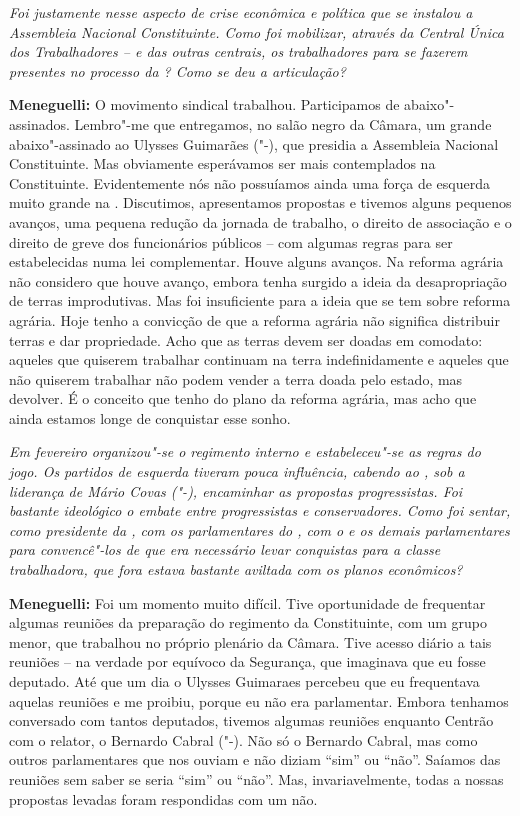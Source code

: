 \emph{Foi justamente nesse aspecto de crise econômica e política que
se instalou a Assembleia Nacional Constituinte. Como foi mobilizar,
através da Central Única dos Trabalhadores --  e das outras centrais,
os trabalhadores para se fazerem presentes no processo da ? Como se
deu a articulação?}

\textbf{Meneguelli:} O movimento sindical trabalhou. Participamos de
abaixo"-assinados. Lembro"-me que entregamos, no salão negro da Câmara, um
grande abaixo"-assinado ao Ulysses Guimarães ("-), que presidia a
Assembleia Nacional Constituinte. Mas obviamente esperávamos ser mais
contemplados na Constituinte. Evidentemente nós não possuíamos ainda uma
força de esquerda muito grande na . Discutimos, apresentamos
propostas e tivemos alguns pequenos avanços, uma pequena redução da
jornada de trabalho, o direito de associação e o direito de greve dos
funcionários públicos -- com algumas regras para ser estabelecidas numa
lei complementar. Houve alguns avanços. Na reforma agrária não considero
que houve avanço, embora tenha surgido a ideia da desapropriação de
terras improdutivas. Mas foi insuficiente para a ideia que se tem sobre
reforma agrária. Hoje tenho a convicção de que a reforma agrária não
significa distribuir terras e dar propriedade. Acho que as terras devem
ser doadas em comodato: aqueles que quiserem trabalhar continuam na
terra indefinidamente e aqueles que não quiserem trabalhar não podem
vender a terra doada pelo estado, mas devolver. É o conceito que tenho
do plano da reforma agrária, mas acho que ainda estamos longe de
conquistar esse sonho.

\emph{Em fevereiro organizou"-se o regimento interno e estabeleceu"-se
as regras do jogo. Os partidos de esquerda tiveram pouca influência,
cabendo ao , sob a liderança de Mário Covas ("-), encaminhar as
propostas progressistas. Foi bastante ideológico o embate entre
progressistas e conservadores. Como foi sentar, como presidente da ,
com os parlamentares do , com o  e os demais parlamentares para
convencê"-los de que era necessário levar conquistas para a classe
trabalhadora, que fora estava bastante aviltada com os planos
econômicos?}

\textbf{Meneguelli:} Foi um momento muito difícil. Tive oportunidade de
frequentar algumas reuniões da preparação do regimento da Constituinte,
com um grupo menor, que trabalhou no próprio plenário da Câmara. Tive
acesso diário a tais reuniões -- na verdade por equívoco da Segurança,
que imaginava que eu fosse deputado. Até que um dia o Ulysses Guimaraes
percebeu que eu frequentava aquelas reuniões e me proibiu, porque eu não
era parlamentar. Embora tenhamos conversado com tantos deputados,
tivemos algumas reuniões enquanto Centrão com o relator, o Bernardo
Cabral ("-). Não só o Bernardo Cabral, mas como outros
parlamentares que nos ouviam e não diziam ``sim'' ou ``não''. Saíamos
das reuniões sem saber se seria ``sim'' ou ``não''. Mas,
invariavelmente, todas a nossas propostas levadas foram respondidas com
um não.

